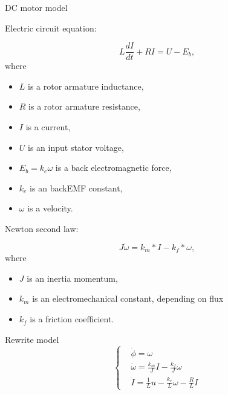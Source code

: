 \documentclass{article}
\begin{document}
\begin{center}
	DC motor model
\end{center}

Electric circuit equation:

\begin{equation}
	L\frac{dI}{dt}+RI=U-E_b,
\end{equation}
where
\begin{itemize}
	\item $L$ is a rotor armature inductance,
	\item $R$ is a rotor armature resistance,
	\item $I$ is a current,
	\item $U$ is an input stator voltage,
	\item $E_b=k_e\omega$ is a back electromagnetic force, \item $k_e$ is an backEMF constant,
	\item $\omega$ is a velocity. 
\end{itemize}

Newton second law:

\begin{equation}
	J\dot{\omega}=k_m*I-k_f*\omega,
\end{equation}
where
\begin{itemize}
	\item $J$ is an inertia momentum,
	\item $k_m$ is an electromechanical constant, depending on flux
	\item $k_f$ is a friction coefficient.
\end{itemize}

Rewrite model
\begin{equation}
\left\{\begin{aligned}
		&\dot{\phi}=\omega\\
		&\dot{\omega}=\frac{k_m}{J}I-\frac{k_f}{J}\omega\\
		&\dot{I}=\frac{1}{L}u-\frac{k_e}{L}\omega-\frac{R}{L}I
		\end{aligned} \right.
\end{equation}
	
\end{document}
